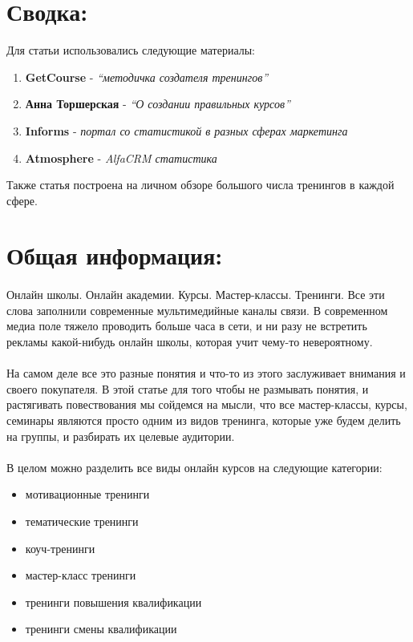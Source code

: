 \documentclass{article}
\begin{document}
\section{Сводка:}
Для статьи использовались следующие материалы:
\newline
\begin{enumerate}
    \item \textbf{GetCourse} - \textit{“методичка создателя тренингов”}
    \item \textbf{Анна Торшерская} - \textit{“О создании правильных курсов”}
    \item \textbf{Informs} - \textit{портал со статистикой в разных сферах маркетинга}
    \item \textbf{Atmosphere } - \textit{AlfaCRM статистика}
\end{enumerate}
Также статья построена на личном обзоре большого числа тренингов в каждой сфере.

\section{Общая информация:}
\paragraph{}
Онлайн школы. Онлайн академии. Курсы. Мастер-классы. Тренинги. Все эти слова заполнили современные мультимедийные каналы связи. В современном медиа поле тяжело проводить больше часа в сети, и ни разу не встретить рекламы какой-нибудь онлайн школы, которая учит чему-то невероятному. 
\paragraph{}
На самом деле все это разные понятия и что-то из этого заслуживает внимания и своего покупателя. В этой статье для того чтобы не размывать понятия, и растягивать повествования мы сойдемся на мысли, что все мастер-классы, курсы, семинары являются просто одним из видов тренинга, которые уже будем делить на группы, и разбирать их целевые аудитории. 
\paragraph{}
В целом можно разделить все виды онлайн курсов на следующие категории:
\begin{itemize}
    \item мотивационные тренинги
    \item тематические тренинги
    \item коуч-тренинги
    \item мастер-класс тренинги
    \item тренинги повышения квалификации
    \item тренинги смены квалификации
\end{itemize}
\end{document}
